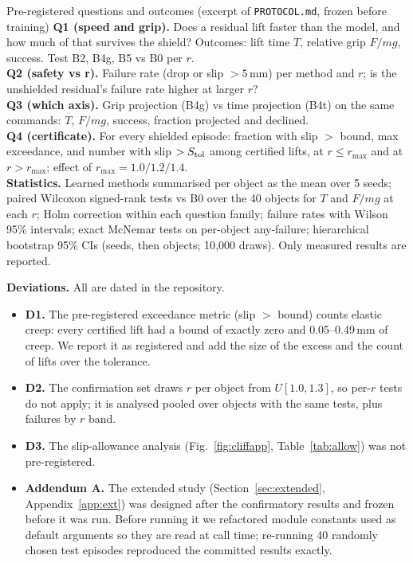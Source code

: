 \begin{codebox}{Pre-registered questions and outcomes (excerpt of \texttt{PROTOCOL.md}, frozen before training)}
\small
\textbf{Q1 (speed and grip).} Does a residual lift faster than the model, and how much of that survives the shield?
Outcomes: lift time $T$, relative grip $F/mg$, success. Test B2, B4g, B5 vs B0 per $r$.\\[2pt]
\textbf{Q2 (safety vs r).} Failure rate (drop or slip $>5$\,mm) per method and $r$; is the unshielded residual's failure rate
higher at larger $r$?\\[2pt]
\textbf{Q3 (which axis).} Grip projection (B4g) vs time projection (B4t) on the same commands: $T$, $F/mg$, success,
fraction projected and declined.\\[2pt]
\textbf{Q4 (certificate).} For every shielded episode: fraction with slip $>$ bound, max exceedance, and number with slip
$>S_{\rm tol}$ among certified lifts, at $r\le r_{\max}$ and at $r>r_{\max}$; effect of $r_{\max}=1.0/1.2/1.4$.\\[2pt]
\textbf{Statistics.} Learned methods summarised per object as the mean over 5 seeds; paired Wilcoxon signed-rank tests vs B0
over the 40 objects for $T$ and $F/mg$ at each $r$; Holm correction within each question family; failure rates with Wilson
95\% intervals; exact McNemar tests on per-object any-failure; hierarchical bootstrap 95\% CIs (seeds, then objects; 10{,}000
draws). Only measured results are reported.
\end{codebox}

\textbf{Deviations.} All are dated in the repository.
\begin{itemize}[leftmargin=1.5em]
\item \textbf{D1.} The pre-registered exceedance metric (slip $>$ bound) counts elastic creep: every certified lift had a bound
of exactly zero and 0.05--0.49\,mm of creep. We report it as registered and add the size of the excess and the count of
lifts over the tolerance.
\item \textbf{D2.} The confirmation set draws $r$ per object from $U[1.0,1.3]$, so per-$r$ tests do not apply; it is analysed
pooled over objects with the same tests, plus failures by $r$ band.
\item \textbf{D3.} The slip-allowance analysis (Fig.~\ref{fig:cliffapp}, Table~\ref{tab:allow}) was not pre-registered.
\item \textbf{Addendum A.} The extended study (Section~\ref{sec:extended}, Appendix~\ref{app:ext}) was designed after the
confirmatory results and frozen before it was run. Before running it we refactored module constants used as default
arguments so they are read at call time; re-running 40 randomly chosen test episodes reproduced the committed results
exactly.
\end{itemize}

